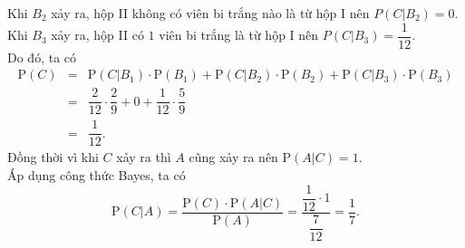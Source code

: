 \begin{bt}
{\begin{listEX}
			Khi $B_2$ xảy ra, hộp II không có viên bi trắng nào là từ hộp I nên $P(C|B_2)=0$.\\
			Khi $B_3$ xảy ra, hộp II có $1$ viên bi trắng là từ hộp I nên $P(C|B_3)=\dfrac{1}{12}$.\\
			Do đó, ta có
			\allowdisplaybreaks
			\begin{eqnarray*}
				\mathrm{P}(C) &=& \mathrm{P}(C|B_1)\cdot \mathrm{P}(B_1) + \mathrm{P}(C|B_2)\cdot \mathrm{P}(B_2) + \mathrm{P}(C|B_3)\cdot \mathrm{P}(B_3)\\
				&=& \dfrac{2}{12}\cdot \dfrac{2}{9} + 0 + \dfrac{1}{12}\cdot \dfrac{5}{9}\\
				&=& \dfrac{1}{12}.
			\end{eqnarray*}
			Đồng thời vì khi $C$ xảy ra thì $A$ cũng xảy ra nên $\mathrm{P}(A|C)=1$.\\
			Áp dụng công thức Bayes, ta có
			$$\mathrm{P}(C|A) = \dfrac{\mathrm{P}(C)\cdot \mathrm{P}(A|C)}{\mathrm{P}(A)} 
				= \dfrac{\dfrac{1}{12}\cdot 1}{\dfrac{7}{12}} = \dfrac{1}{7}.$$
		\end{listEX}
	}
\end{bt}

